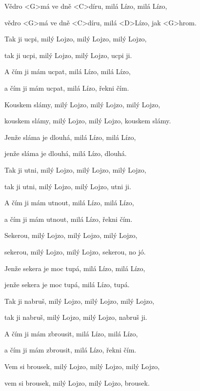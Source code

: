 







\zs
Vědro <G>má ve dně <C>díru, milá Lízo, milá Lízo,

vědro <G>má ve dně <C>díru, milá <D>Lízo, jak <G>hrom.
\ks

\zs
Tak ji ucpi, milý Lojzo, milý Lojzo, milý Lojzo,

tak ji ucpi, milý Lojzo, milý Lojzo, ucpi ji.
\ks

\zs
A čím ji mám ucpat, milá Lízo, milá Lízo,

a čím ji mám ucpat, milá Lízo, řekni čím.
\ks

\zs
Kouskem slámy, milý Lojzo, milý Lojzo, milý Lojzo,

kouskem slámy, milý Lojzo, milý Lojzo, kouskem slámy.
\ks

\zs
Jenže sláma je dlouhá, milá Lízo, milá Lízo,

jenže sláma je dlouhá, milá Lízo, dlouhá.
\ks

\zs
Tak ji utni, milý Lojzo, milý Lojzo, milý Lojzo,

tak ji utni, milý Lojzo, milý Lojzo, utni ji.
\ks

\zs
A čím ji mám utnout, milá Lízo, milá Lízo,

a čím ji mám utnout, milá Lízo, řekni čím.
\ks

\zs
Sekerou, milý Lojzo, milý Lojzo, milý Lojzo,

sekerou, milý Lojzo, milý Lojzo, sekerou, no jó.
\ks

\zs
Jenže sekera je moc tupá, milá Lízo, milá Lízo,

jenže sekera je moc tupá, milá Lízo, tupá.
\ks

\zs
Tak ji nabruš, milý Lojzo, milý Lojzo, milý Lojzo,

tak ji nabruš, milý Lojzo, milý Lojzo, nabruš ji.
\ks

\zs
A čím ji mám zbrousit, milá Lízo, milá Lízo,

a čím ji mám zbrousit, milá Lízo, řekni čím.
\ks

\zs
Vem si brousek, milý Lojzo, milý Lojzo, milý Lojzo,

vem si brousek, milý Lojzo, milý Lojzo, brousek.
\ks

